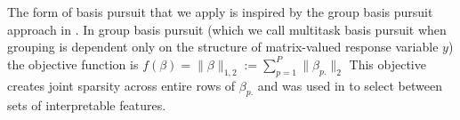 The form of basis pursuit that we apply is inspired by the group basis pursuit approach in \citet{Koelle2022-ju}.
In group basis pursuit (which we call multitask basis pursuit when grouping is dependent only on the structure of matrix-valued response variable $y$) the objective function is $f(\beta) = \|\beta\|_{1,2} := \sum_{p=1}^P \|\beta_{p.}\|_2$  \citep{Yuan2006-bt, Obozinski2006-kq, Yeung2011-fg}
This objective creates joint sparsity across entire rows of $\beta_{p.}$ and was used in \citep{Koelle2022-ju} to select between sets of interpretable features.
